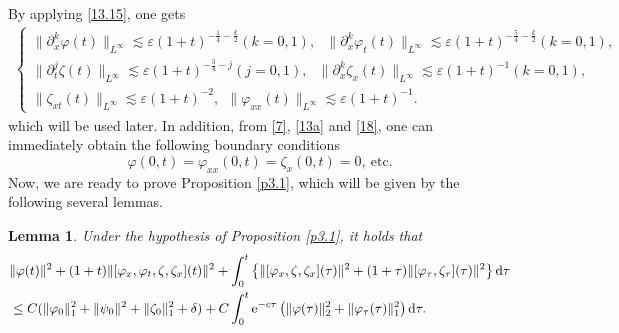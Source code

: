 \documentclass[11pt]{article}
\theoremstyle{plain}
\newtheorem{lemma}{Lemma}[section]
\numberwithin{equation}{section}
\begin{document}
	By applying \eqref{13.15}, one gets
	\begin{align}\label{13.18}
		\left\{
		\begin{array}{lr}
		\|\partial_x^k\varphi(t)\|_{L^{\infty}}\lesssim\varepsilon(1+t)^{-\frac{1}{4}-\frac{k}{2}} (k=0,1),\ \ \ \|\partial_x^k\varphi_t(t)\|_{L^{\infty}}\lesssim\varepsilon(1+t)^{-\frac{5}{4}-\frac{k}{2}}(k=0,1),\\[2mm]
			\|\partial_t^j\zeta(t)\|_{L^{\infty}}\lesssim\varepsilon(1+t)^{-\frac{3}{4}-j} (j=0,1),\ \ \ \|\partial_x^k\zeta_x(t)\|_{L^{\infty}}\lesssim\varepsilon(1+t)^{-1} (k=0,1),\\[2mm]
			\|\zeta_{xt}(t)\|_{L^{\infty}}\lesssim\varepsilon(1+t)^{-2},\ \  \|\varphi_{xx}(t)\|_{L^{\infty}}\lesssim\varepsilon(1+t)^{-1}. 
		\end{array}
		\right.
	\end{align}
	which will be used later. 
	In addition, from \eqref{7}, \eqref{13a} and \eqref{18}, one can immediately obtain the following boundary conditions
	\begin{equation}\label{13.19}
		\varphi(0,t)=\varphi_{xx}(0,t)=\zeta_x(0,t)=0, ~\mbox{etc}.
	\end{equation}
	Now, we are ready to prove Proposition \ref{p3.1}, which will be given by the following several lemmas.
	\begin{lemma}\label{l3.3}
	Under the hypothesis of Proposition \ref{p3.1}, it holds that
	\begin{align}\label{43}
			&\|\varphi(t)\|^2+(1+t)\|[\varphi_x,\varphi_t,\zeta,\zeta_x](t)\|^2+\int_{0}^{t}\left\{\|[\varphi_x,\zeta,\zeta_x](\tau)\|^2+(1+\tau)\|[\varphi_{\tau},\zeta_{\tau}](\tau)\|^2\right\}{\rm d}\tau\notag\\ 
			&\leq C(\|\varphi_0\|_1^2+\|\psi_0\|^2+\|\zeta_0\|_1^2+\delta)+C\int_{0}^{t}{\rm e}^{-c\tau}\left(\|\varphi(\tau)\|_2^2+\|\varphi_{\tau}(\tau)\|_1^2\right){\rm d}\tau.
		\end{align}
	\end{lemma}
\end{document}
